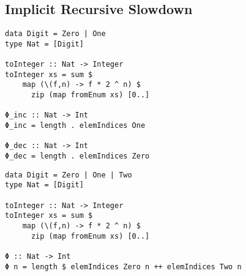 \subsection{Implicit Recursive Slowdown}

\begin{frame}[fragile]
  \begin{verbatim}
data Digit = Zero | One
type Nat = [Digit]

toInteger :: Nat -> Integer
toInteger xs = sum $
    map (\(f,n) -> f * 2 ^ n) $
      zip (map fromEnum xs) [0..]

Φ_inc :: Nat -> Int
Φ_inc = length . elemIndices One

Φ_dec :: Nat -> Int
Φ_dec = length . elemIndices Zero
  \end{verbatim}
\end{frame}

\begin{frame}[fragile]
  \begin{verbatim}
data Digit = Zero | One | Two
type Nat = [Digit]

toInteger :: Nat -> Integer
toInteger xs = sum $
    map (\(f,n) -> f * 2 ^ n) $
      zip (map fromEnum xs) [0..]

Φ :: Nat -> Int
Φ n = length $ elemIndices Zero n ++ elemIndices Two n
  \end{verbatim}
\end{frame}




